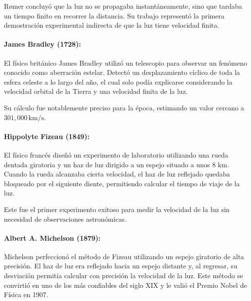 Rømer concluyó que la luz no se propagaba instantáneamente, sino que tardaba un tiempo finito en recorrer la distancia. Su trabajo representó la primera demostración experimental indirecta de que la luz tiene velocidad finita.

\vspace{0.3cm}

\paragraph{James Bradley (1728):} El físico británico James Bradley utilizó un telescopio para observar un fenómeno conocido como aberración estelar. Detectó un desplazamiento cíclico de toda la esfera celeste a lo largo del año, el cual solo podía explicarse considerando la velocidad orbital de la Tierra y una velocidad finita de la luz.

Su cálculo fue notablemente preciso para la época, estimando un valor cercano a $301,000\,\mathrm{km/s}$.

\paragraph{Hippolyte Fizeau (1849):} El físico francés diseñó un experimento de laboratorio utilizando una rueda dentada giratoria y un haz de luz dirigido a un espejo situado a unos 8 km. Cuando la rueda alcanzaba cierta velocidad, el haz de luz reflejado quedaba bloqueado por el siguiente diente, permitiendo calcular el tiempo de viaje de la luz.

Este fue el primer experimento exitoso para medir la velocidad de la luz sin necesidad de observaciones astronómicas.

\paragraph{Albert A. Michelson (1879):} Michelson perfeccionó el método de Fizeau utilizando un espejo giratorio de alta precisión. El haz de luz era reflejado hacia un espejo distante y, al regresar, su desviación permitía calcular con precisión la velocidad de la luz. Este método se convirtió en uno de los más confiables del siglo XIX y le valió el Premio Nobel de Física en 1907.

\vspace{0.3cm}

